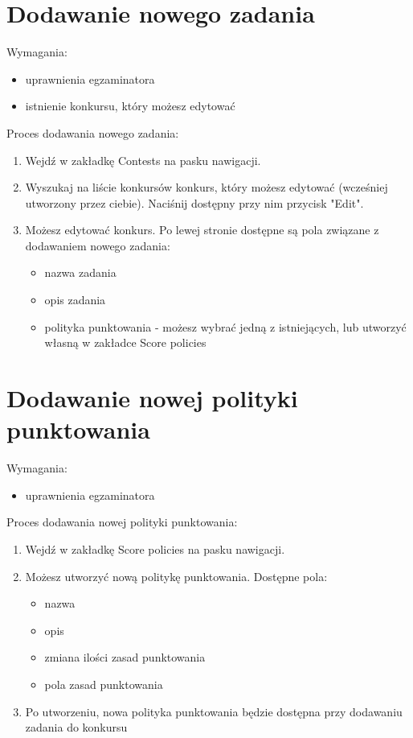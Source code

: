 \documentclass{article}
\begin{document}
\section{Dodawanie nowego zadania}
Wymagania:
\begin{itemize}
	\item uprawnienia egzaminatora
	\item istnienie konkursu, który możesz edytować
\end{itemize}
Proces dodawania nowego zadania:
\begin{enumerate}
	\item Wejdź w zakładkę Contests na pasku nawigacji.
	\item Wyszukaj na liście konkursów konkurs, który możesz edytować (wcześniej utworzony przez ciebie). Naciśnij dostępny przy nim przycisk "Edit".
	\item Możesz edytować konkurs. Po lewej stronie dostępne są pola związane z dodawaniem nowego zadania:
	\begin{itemize}
		\item nazwa zadania
		\item opis zadania
		\item polityka punktowania - możesz wybrać jedną z istniejących, lub utworzyć własną w zakładce Score policies
	\end{itemize}
\end{enumerate}

\section{Dodawanie nowej polityki punktowania}
Wymagania:
\begin{itemize}
	\item uprawnienia egzaminatora
\end{itemize}
Proces dodawania nowej polityki punktowania:
\begin{enumerate}
	\item Wejdź w zakładkę Score policies na pasku nawigacji.
	\item Możesz utworzyć nową politykę punktowania. Dostępne pola:
	\begin{itemize}
		\item nazwa
		\item opis
		\item zmiana ilości zasad punktowania
		\item pola zasad punktowania
	\end{itemize}
	\item Po utworzeniu, nowa polityka punktowania będzie dostępna przy dodawaniu zadania do konkursu
\end{enumerate}
\end{document}
